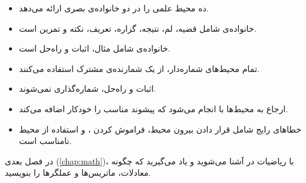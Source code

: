 \begin{itemize}
    \item {} ده محیط علمی را در دو
    خانواده‌ی بصری ارائه می‌دهد.

    \item خانواده‌ی  شامل قضیه، لم،
    نتیجه، گزاره، تعریف، نکته و تمرین است.

    \item خانواده‌ی  شامل مثال،
    اثبات و راه‌حل است.

    \item تمام محیط‌های شماره‌دار، از یک
    شمارنده‌ی مشترک استفاده می‌کنند.

    \item اثبات و راه‌حل، شماره‌گذاری نمی‌شوند.

    \item ارجاع به محیط‌ها با  انجام
    می‌شود که پیشوند مناسب را خودکار اضافه
    می‌کند.

    \item خطاهای رایج شامل قرار دادن 
    بیرون محیط، فراموش کردن ، و
    استفاده از محیط نامناسب است.
\end{itemize}

در فصل بعدی (\cref{chap:math})، با ریاضیات
در  آشنا می‌شوید و یاد می‌گیرید
که چگونه معادلات، ماتریس‌ها و عملگرها را
بنویسید.